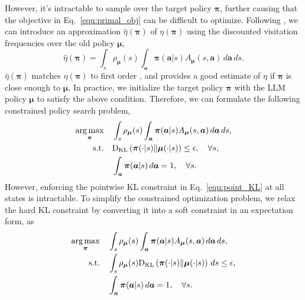 \documentclass[11pt]{article}
\theoremstyle{plain}
\theoremstyle{remark}
\begin{document}
However, it's intractable to sample over the target policy $\boldsymbol{\pi}$, further causing that the objective in Eq.~\eqref{equ:primal_obj} can be difficult to optimize. Following \citep{pmlr-v37-schulman15ppo}, we can introduce an approximation $\hat{\eta}(\boldsymbol{\pi})$ of $\eta(\boldsymbol{\pi})$ using the discounted visitation frequencies over the old policy $\boldsymbol{\mu}$, 
\begin{equation*}
    \hat{\eta}(\boldsymbol{\pi}) = \int_{s}\rho_{\boldsymbol{\mu}}(s)\int_{\boldsymbol{a}}\boldsymbol{\pi}(\boldsymbol{a}|s)A_{\boldsymbol{\mu}}(s, \boldsymbol{a})\,d\boldsymbol{a}\,ds.
\end{equation*}
$\hat{\eta}(\boldsymbol{\pi})$ matches $\eta(\boldsymbol{\pi})$ to first order \citep{Langford02icml}, and provides a good estimate of $\eta$ if $\boldsymbol{\pi}$ is close enough to $\boldsymbol{\mu}$. In practice, we initialize the target policy $\boldsymbol{\pi}$ with the LLM policy $\boldsymbol{\mu}$ to satisfy the above condition. Therefore, we can formulate the following constrained policy search problem,
\begin{align}
    \mathop{\arg\max}\limits_{\boldsymbol{\pi}} & \quad \int_{s}\rho_{\boldsymbol{\mu}}(s) \int_{\boldsymbol{a}} \boldsymbol{\pi}(\boldsymbol{a}|s) A_{\boldsymbol{\mu}}(s, \boldsymbol{a})\,d\boldsymbol{a}\,ds, \\
    {\rm s.t.} & \quad {\rm D}_{\rm KL}\left(\boldsymbol{\pi}(\cdot|s) \| \boldsymbol{\mu}(\cdot|s)\right) \leq \epsilon, \quad \forall s, \label{equ:point_KL} \\
    & \quad \int_{\boldsymbol{a}}\boldsymbol{\pi}(\boldsymbol{a}|s)\,d\boldsymbol{a} = 1, \quad \forall s.
\end{align}
However, enforcing the pointwise KL constraint in Eq.~\eqref{equ:point_KL} at all states is intractable. To simplify the constrained optimization problem, we relax the hard KL constraint by converting it into a soft constraint in an expectation form, as
\begin{align*}
    \mathop{\arg\max}\limits_{\boldsymbol{\pi}} & \quad \int_{s}\rho_{\boldsymbol{\mu}}(s) \int_{\boldsymbol{a}}\boldsymbol{\pi}(\boldsymbol{a}|s) A_{\boldsymbol{\mu}}(s, \boldsymbol{a})\,d\boldsymbol{a}\,ds, \\
    {\rm s.t.} & \quad \int_{s} \rho_{\boldsymbol{\mu}}(s) {\rm D}_{\rm KL}\left(\boldsymbol{\pi}(\cdot|s) \| \boldsymbol{\mu}(\cdot|s)\right)\,ds \leq \epsilon, \\
    & \quad \int_{\boldsymbol{a}}\boldsymbol{\pi}(\boldsymbol{a}|s)\,d\boldsymbol{a} = 1, \quad \forall s.
\end{align*}
\end{document}
